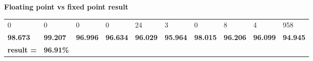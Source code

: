 \documentclass[xcolor=dvipsnames]{beamer}
\begin{document}
\begin{frame}{\bf Floating point vs fixed point result}
{\begin{table}[]
\begin{tabular}{llllllllll}
0                                        & 0                                       & 0               & 0               & 24              & 3               & 0               & 8               & 4               & 958             \\
\textbf{98.673}                          & \textbf{99.207}                         & \textbf{96.996} & \textbf{96.634} & \textbf{96.029} & \textbf{95.964} & \textbf{98.015} & \textbf{96.206} & \textbf{96.099} & \textbf{94.945} \\
{\color[HTML]{FE0000} \textbf{result =}} & {\color[HTML]{FE0000} \textbf{96.91\%}} &                 &                 &                 &                 &                 &                 &                 &
\end{tabular}
\end{table}
}

\end{frame}


\begin{frame}


\end{frame}
\end{document}
